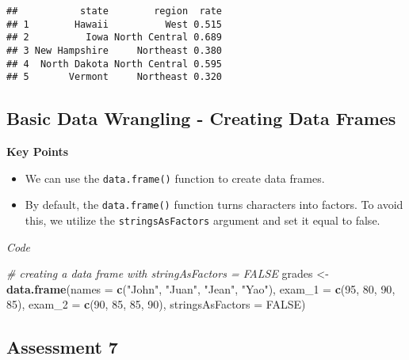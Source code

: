 \documentclass[
]{article}
\newenvironment{Shaded}{\begin{snugshade}}{\end{snugshade}}
\newcommand{\CommentTok}[1]{\textcolor[rgb]{0.56,0.35,0.01}{\textit{#1}}}
\newcommand{\DataTypeTok}[1]{\textcolor[rgb]{0.13,0.29,0.53}{#1}}
\newcommand{\DecValTok}[1]{\textcolor[rgb]{0.00,0.00,0.81}{#1}}
\newcommand{\KeywordTok}[1]{\textcolor[rgb]{0.13,0.29,0.53}{\textbf{#1}}}
\newcommand{\NormalTok}[1]{#1}
\newcommand{\OtherTok}[1]{\textcolor[rgb]{0.56,0.35,0.01}{#1}}
\newcommand{\StringTok}[1]{\textcolor[rgb]{0.31,0.60,0.02}{#1}}
\providecommand{\tightlist}{%
  \setlength{\itemsep}{0pt}\setlength{\parskip}{0pt}}
\begin{document}
\begin{verbatim}
##           state        region  rate
## 1        Hawaii          West 0.515
## 2          Iowa North Central 0.689
## 3 New Hampshire     Northeast 0.380
## 4  North Dakota North Central 0.595
## 5       Vermont     Northeast 0.320
\end{verbatim}

\hypertarget{basic-data-wrangling---creating-data-frames}{%
\subsection{Basic Data Wrangling - Creating Data
Frames}\label{basic-data-wrangling---creating-data-frames}}

\textbf{Key Points}

\begin{itemize}
\tightlist
\item
  We can use the \texttt{data.frame()} function to create data frames.
\item
  By default, the \texttt{data.frame()} function turns characters into
  factors. To avoid this, we utilize the \texttt{stringsAsFactors}
  argument and set it equal to false.
\end{itemize}

\emph{Code}

\begin{Shaded}
\begin{Highlighting}[]
\CommentTok{# creating a data frame with stringAsFactors = FALSE}
\NormalTok{grades <-}\StringTok{ }\KeywordTok{data.frame}\NormalTok{(}\DataTypeTok{names =} \KeywordTok{c}\NormalTok{(}\StringTok{"John"}\NormalTok{, }\StringTok{"Juan"}\NormalTok{, }\StringTok{"Jean"}\NormalTok{, }\StringTok{"Yao"}\NormalTok{), }
                     \DataTypeTok{exam_1 =} \KeywordTok{c}\NormalTok{(}\DecValTok{95}\NormalTok{, }\DecValTok{80}\NormalTok{, }\DecValTok{90}\NormalTok{, }\DecValTok{85}\NormalTok{), }
                     \DataTypeTok{exam_2 =} \KeywordTok{c}\NormalTok{(}\DecValTok{90}\NormalTok{, }\DecValTok{85}\NormalTok{, }\DecValTok{85}\NormalTok{, }\DecValTok{90}\NormalTok{),}
                     \DataTypeTok{stringsAsFactors =} \OtherTok{FALSE}\NormalTok{)}
\end{Highlighting}
\end{Shaded}

\hypertarget{assessment-7}{%
\subsection{Assessment 7}\label{assessment-7}}
\end{document}
